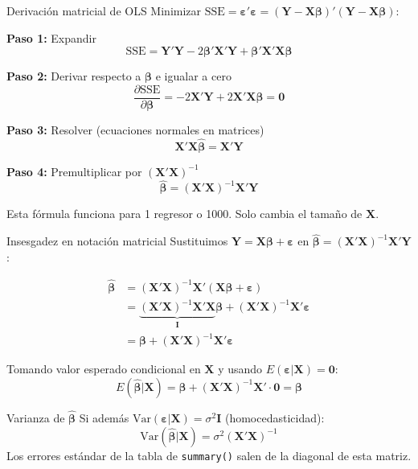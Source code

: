 \documentclass[aspectratio=169, 11pt]{beamer}
\begin{document}
\begin{frame}{Derivación matricial de OLS}
\small
Minimizar $\text{SSE} = \boldsymbol{\varepsilon}'\boldsymbol{\varepsilon} = (\mathbf{Y} - \mathbf{X}\boldsymbol{\beta})'(\mathbf{Y} - \mathbf{X}\boldsymbol{\beta})$:

\vspace{0.1cm}
\textbf{Paso 1:} Expandir
\[
\text{SSE} = \mathbf{Y}'\mathbf{Y} - 2\boldsymbol{\beta}'\mathbf{X}'\mathbf{Y} + \boldsymbol{\beta}'\mathbf{X}'\mathbf{X}\boldsymbol{\beta}
\]

\textbf{Paso 2:} Derivar respecto a $\boldsymbol{\beta}$ e igualar a cero
\[
\frac{\partial \text{SSE}}{\partial \boldsymbol{\beta}} = -2\mathbf{X}'\mathbf{Y} + 2\mathbf{X}'\mathbf{X}\boldsymbol{\beta} = \mathbf{0}
\]

\textbf{Paso 3:} Resolver (ecuaciones normales en matrices)
\[
\mathbf{X}'\mathbf{X}\hat{\boldsymbol{\beta}} = \mathbf{X}'\mathbf{Y}
\]

\textbf{Paso 4:} Premultiplicar por $(\mathbf{X}'\mathbf{X})^{-1}$
\[
\boxed{\hat{\boldsymbol{\beta}} = (\mathbf{X}'\mathbf{X})^{-1}\mathbf{X}'\mathbf{Y}}
\]

\begin{alertblock}{}
\small Esta fórmula funciona para 1 regresor o 1000. Solo cambia el tamaño de $\mathbf{X}$.
\end{alertblock}
\end{frame}


\begin{frame}{Insesgadez en notación matricial}
\small
Sustituimos $\mathbf{Y} = \mathbf{X}\boldsymbol{\beta} + \boldsymbol{\varepsilon}$ en $\hat{\boldsymbol{\beta}} = (\mathbf{X}'\mathbf{X})^{-1}\mathbf{X}'\mathbf{Y}$:

\begin{align*}
\hat{\boldsymbol{\beta}} &= (\mathbf{X}'\mathbf{X})^{-1}\mathbf{X}'(\mathbf{X}\boldsymbol{\beta} + \boldsymbol{\varepsilon}) \\
&= \underbrace{(\mathbf{X}'\mathbf{X})^{-1}\mathbf{X}'\mathbf{X}}_{\mathbf{I}}\boldsymbol{\beta} + (\mathbf{X}'\mathbf{X})^{-1}\mathbf{X}'\boldsymbol{\varepsilon} \\
&= \boldsymbol{\beta} + (\mathbf{X}'\mathbf{X})^{-1}\mathbf{X}'\boldsymbol{\varepsilon}
\end{align*}

Tomando valor esperado condicional en $\mathbf{X}$ y usando $E(\boldsymbol{\varepsilon} | \mathbf{X}) = \mathbf{0}$:
\[
E(\hat{\boldsymbol{\beta}} | \mathbf{X}) = \boldsymbol{\beta} + (\mathbf{X}'\mathbf{X})^{-1}\mathbf{X}' \cdot \mathbf{0} = \boxed{\boldsymbol{\beta}}
\]

\begin{block}{Varianza de $\hat{\boldsymbol{\beta}}$}
Si además $\text{Var}(\boldsymbol{\varepsilon} | \mathbf{X}) = \sigma^2 \mathbf{I}$ (homocedasticidad):
\[
\text{Var}(\hat{\boldsymbol{\beta}} | \mathbf{X}) = \sigma^2 (\mathbf{X}'\mathbf{X})^{-1}
\]
Los errores estándar de la tabla de \texttt{summary()} salen de la diagonal de esta matriz.
\end{block}
\end{frame}
\end{document}
